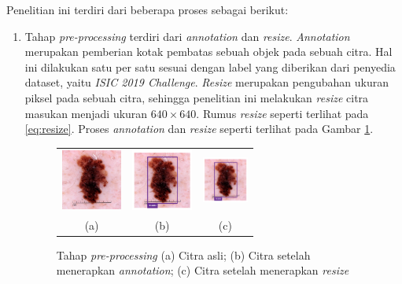 Penelitian ini terdiri dari beberapa proses sebagai berikut:
\begin{enumerate}
    \item Tahap \textit{pre-processing} terdiri dari \textit{annotation} dan \textit{resize}. \textit{Annotation} merupakan pemberian kotak pembatas sebuah objek pada sebuah citra. Hal ini dilakukan satu per satu sesuai dengan label yang diberikan dari penyedia dataset, yaitu \textit{ISIC 2019 Challenge}. \textit{Resize} merupakan pengubahan ukuran piksel pada sebuah citra, sehingga penelitian ini melakukan \textit{resize} citra masukan menjadi ukuran $640\times 640$. Rumus \textit{resize} seperti terlihat pada \ref{eq:resize}. Proses \textit{annotation} dan \textit{resize} seperti terlihat pada Gambar \ref{fig:preprocessing}.
    \begin{figure}[H]
        \centering
        \begin{tabular}{ccc}
            \includegraphics[width=2cm]{img/bab2/dermoscopy.jpg}
            &
            \includegraphics[width=2cm]{img/bab3/annotation.png}
            &
            \includegraphics[width=1.5cm]{img/bab3/annotation.png}\\
            (a) &(b) &(c)\\
        \end{tabular}
        \caption{Tahap \textit{pre-processing} (a) Citra asli; (b) Citra setelah menerapkan \textit{annotation}; (c) Citra setelah menerapkan \textit{resize}}
        \label{fig:preprocessing}
    \end{figure}


\end{enumerate}
